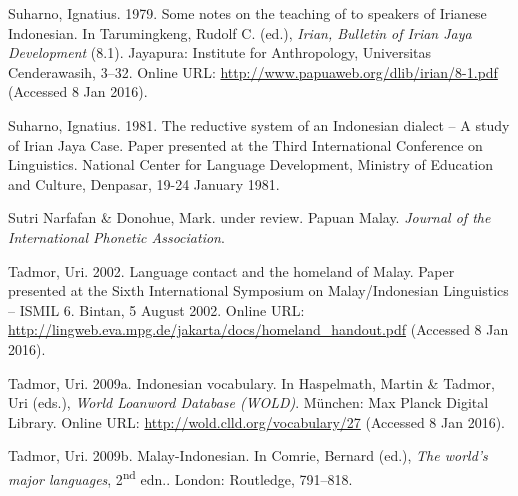 \begin{styleCitaviBibliographyEntry}
Suharno, Ignatius. 1979. Some notes on the teaching of  to speakers of Irianese Indonesian. In Tarumingkeng, Rudolf C. (ed.), \textit{Irian, Bulletin of Irian Jaya Development} (8.1). Jayapura: Institute for Anthropology, Universitas Cenderawasih, 3–32. Online URL: \url{http://www.papuaweb.org/dlib/irian/8-1.pdf} (Accessed 8 Jan 2016).
\end{styleCitaviBibliographyEntry}

\begin{styleCitaviBibliographyEntry}
Suharno, Ignatius. 1981. The reductive system of an Indonesian dialect – A study of Irian Jaya Case. Paper presented at the Third International Conference on  Linguistics. National Center for Language Development, Ministry of Education and Culture, Denpasar, 19-24 January 1981.
\end{styleCitaviBibliographyEntry}

\begin{styleCitaviBibliographyEntry}
Sutri Narfafan \& Donohue, Mark. under review. Papuan Malay. \textit{Journal of the International Phonetic Association}.
\end{styleCitaviBibliographyEntry}

\begin{styleCitaviBibliographyEntry}
Tadmor, Uri. 2002. Language contact and the homeland of Malay. Paper presented at the Sixth International Symposium on Malay/Indonesian Linguistics – ISMIL 6. Bintan, 5 August 2002. Online URL: \url{http://lingweb.eva.mpg.de/jakarta/docs/homeland_handout.pdf} (Accessed 8 Jan 2016).
\end{styleCitaviBibliographyEntry}

\begin{styleCitaviBibliographyEntry}
Tadmor, Uri. 2009a. Indonesian vocabulary. In Haspelmath, Martin \& Tadmor, Uri (eds.), \textit{World Loanword Database (WOLD)}. München: Max Planck Digital Library. Online URL: \url{http://wold.clld.org/vocabulary/27} (Accessed 8 Jan 2016).
\end{styleCitaviBibliographyEntry}

\begin{styleCitaviBibliographyEntry}
Tadmor, Uri. 2009b. Malay-Indonesian. In Comrie, Bernard (ed.), \textit{The world’s major languages}, 2\textsuperscript{nd} edn.. London: Routledge, 791–818.
\end{styleCitaviBibliographyEntry}

